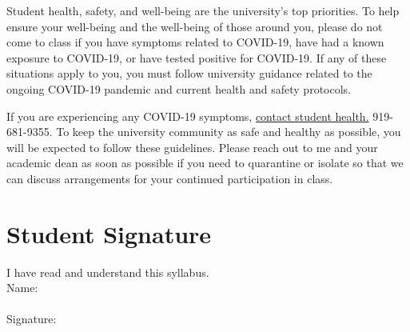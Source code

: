 \documentclass[12pt]{article}
\begin{document}
Student health, safety, and well-being are the university's top priorities. To help ensure your well-being and the well-being of those around you, please do not come to class if you have symptoms related to COVID-19, have had a known exposure to COVID-19, or have tested positive for COVID-19. If any of these situations apply to you, you must follow university guidance related to the ongoing COVID-19 pandemic and current health and safety protocols.  

If you are experiencing any COVID-19 symptoms, \href{https://coronavirus.duke.edu/if-you-feel-sick/}{contact student health.} 919-681-9355. To keep the university community as safe and healthy as possible, you will be expected to follow these guidelines. Please reach out to me and your academic dean as soon as possible if you need to quarantine or isolate so that we can discuss arrangements for your continued participation in class.  

\section{Student Signature}

I have read and understand this syllabus. \\


Name: \\
\vspace{2cm}\\
Signature:
\end{document}
